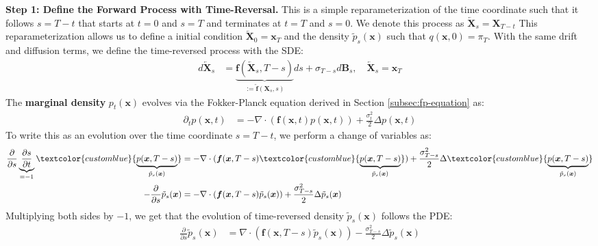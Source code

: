 \documentclass{article}
\newcommand{\bluetext}[1]{\textcolor{customblue}{#1}}
\begin{document}
\textbf{Step 1: Define the Forward Process with Time-Reversal.} 
This is a simple reparameterization of the time coordinate such that it follows $s=T-t$ that starts at $t=0$ and $s=T$ and terminates at $t=T$ and $s=0$. We denote this process as $\overleftarrow{\boldsymbol{X}}_s=\boldsymbol{X}_{T-t}$ This reparameterization allows us to define a initial condition $\overleftarrow{\boldsymbol{X}}_0=\boldsymbol{x}_T$ and the density $\tilde{p}_s(\boldsymbol{x})$ such that $q(\boldsymbol{x},0)=\pi_T$. With the same drift and diffusion terms, we define the time-reversed process with the SDE:
\begin{align}
    d\overleftarrow{\boldsymbol{X}}_s&=\underbrace{\boldsymbol{f}(\overleftarrow{\boldsymbol{X}}_s, T-s)}_{:=\overleftarrow{\boldsymbol{f}}(\boldsymbol{X}_s,s)}ds+\sigma_{T-s}d\boldsymbol{B}_s, \quad \overleftarrow{\boldsymbol{X}}_s=\boldsymbol{x}_T
\end{align}
The \textbf{marginal density} $p_t(\boldsymbol{x})$ evolves via the Fokker-Planck equation derived in Section \ref{subsec:fp-equation} as:
\begin{align}
    \partial_tp(\boldsymbol{x},t)&=-\nabla\cdot (\boldsymbol{f}(\boldsymbol{x},t) p(\boldsymbol{x},t))+\frac{\sigma_t^2}{2}\Delta p(\boldsymbol{x},t)
\end{align}
To write this as an evolution over the time coordinate $s=T-t$, we perform a change of variables as:
\begin{align}
    \frac{\partial}{\partial s}\underbrace{\frac{\partial s}{\partial t}}_{=-1}\bluetext{\underbrace{p(\boldsymbol{x},T-s)}_{\tilde{p}_s(\boldsymbol{x})}}&=-\nabla\cdot (\boldsymbol{f}(\boldsymbol{x},T-s) \bluetext{\underbrace{p(\boldsymbol{x},T-s)}_{\tilde{p}_s(\boldsymbol{x})}})+\frac{\sigma_{T-s}^2}{2}\Delta \bluetext{\underbrace{p(\boldsymbol{x},T-s)}_{\tilde{p}_s(\boldsymbol{x})}}\nonumber\\
    -\frac{\partial}{\partial s}\tilde{p}_s(\boldsymbol{x})&=-\nabla\cdot (\boldsymbol{f}(\boldsymbol{x},T-s) \tilde{p}_s(\boldsymbol{x}))+\frac{\sigma_{T-s}^2}{2}\Delta \tilde{p}_s(\boldsymbol{x})
\end{align}
Multiplying both sides by $-1$, we get that the evolution of time-reversed density $\tilde{p}_s(\boldsymbol{x})$ follows the PDE:
\begin{align}
    \frac{\partial}{\partial s}\tilde{p}_s(\boldsymbol{x})&=\nabla\cdot (\boldsymbol{f}(\boldsymbol{x},T-s) \tilde{p}_s(\boldsymbol{x}))-\frac{\sigma_{T-s}^2}{2}\Delta \tilde{p}_s(\boldsymbol{x})\label{eq:time-rev-eq2}
\end{align}
\end{document}
